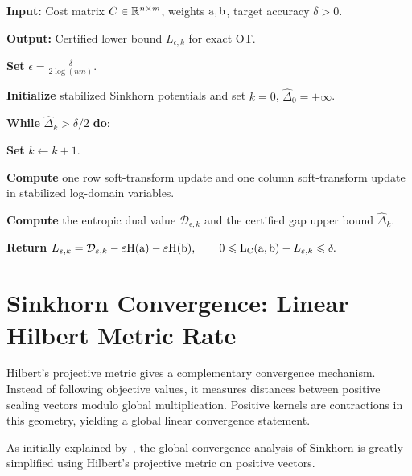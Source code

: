\begin{alg}\label{alg:certified-entropic-ot-accuracy}
\textbf{Input:} Cost matrix $C\in\mathbb{R}^{n\times m}$, weights $\mathrm{a},\mathrm{b}$, target accuracy $\delta>0$.

\textbf{Output:} Certified lower bound $L_{\epsilon,k}$ for exact OT.

\textbf{Set}
\(\epsilon=\frac{\delta}{2\log(nm)}.\)

\textbf{Initialize} stabilized Sinkhorn potentials and set \(k=0\), \(\widehat\Delta_0=+\infty\).

\textbf{While} \(\widehat\Delta_k>\delta/2\) \textbf{do}:
\begin{algblock}

\textbf{Set} \(k\leftarrow k+1\).

\textbf{Compute} one row soft-transform update and one column soft-transform update in stabilized log-domain variables.

\textbf{Compute} the entropic dual value \(\mathcal D_{\epsilon,k}\) and the certified gap upper bound \(\widehat\Delta_k\).
\end{algblock}
\algreturnskip
\textbf{Return} \(L_{\varepsilon,k} = \mathcal D_{\varepsilon,k} - \varepsilon\mathrm{H}(\mathrm{a})-\varepsilon\mathrm{H}(\mathrm{b}), \qquad 0\leqslant\mathrm{L}_{\mathrm{C}}(\mathrm{a},\mathrm{b})-L_{\varepsilon,k}\leqslant\delta.\)
\end{alg}


\section{Sinkhorn Convergence: Linear Hilbert Metric Rate}
\label{sec-sinkhorn-hilbert}

Hilbert's projective metric gives a complementary convergence mechanism. Instead of following objective values, it measures distances between positive scaling vectors modulo global multiplication. Positive kernels are contractions in this geometry, yielding a global linear convergence statement.

As initially explained by~\cite{franklin1989scaling}, the global convergence analysis of Sinkhorn is greatly simplified using Hilbert's projective metric on positive vectors.

